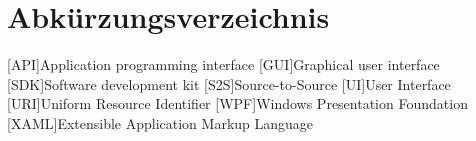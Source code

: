 \chapter{Abkürzungsverzeichnis}
\begin{acronym}[XAML]
[API]{Application programming interface}
[GUI]{Graphical user interface}
[SDK]{Software development kit}
[S2S]{Source-to-Source}
[UI]{User Interface}
[URI]{Uniform Resource Identifier}
[WPF]{Windows Presentation Foundation}
[XAML]{Extensible Application Markup Language}
\end{acronym}